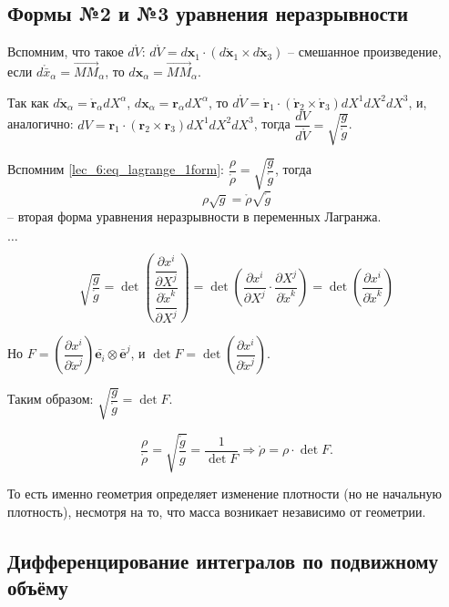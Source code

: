 \subsection{Формы №2 и №3 уравнения неразрывности}

Вспомним, что такое $d\mathring{V}$: $d\mathring{V} = d\mathbf{x}_1 \cdot \left( d\mathring{\mathbf{x}}_1 \times d\mathring{\mathbf{x}}_3 \right) $ -- смешанное произведение, если $d\mathring{\bar{x}}_\alpha = \vec{MM}_\alpha$, то $d\mathbf{x}_\alpha = \vec{MM}_\alpha$.

Так как $d\mathring{\mathbf{x}}_\alpha = \mathring{\mathbf{r}}_\alpha dX^\alpha$,
$d\mathbf{x}_\alpha = \mathbf{r}_\alpha dX^\alpha$, то $d\mathring{V} = \mathring{\mathbf{r}}_1 \cdot \left( \mathring{\mathbf{r}}_2 \times \mathring{\mathbf{r}}_3 \right) dX^1 dX^2 dX^3 $,
и, аналогично: $dV = \mathbf{r}_1 \cdot \left(\mathbf{r}_2 \times \mathbf{r}_3 \right) dX^1 dX^2 dX^3$, тогда $ \dfrac{dV}{d\mathring{V}} = \sqrt{\dfrac{g}{\mathring{g}}} $.

Вспомним \eqref{lec_6:eq_lagrange_1form}: $ \dfrac{\rho}{\mathring{\rho}} = \sqrt{\dfrac{g}{\mathring{g}}} $, тогда
\[
  \rho \sqrt{g} = \mathring{\rho} \sqrt{\mathring{g}}
\]
-- вторая форма уравнения неразрывности в переменных Лагранжа.

$\dots$

\[
  \sqrt{\dfrac{g}{\mathring{g}}}
  = \det\left(\dfrac{\dfrac{\partial x^i}{\partial X^j}}{\dfrac{\partial \mathring{x}^k}{\partial X^j}}\right)
  = \det\left({\dfrac{\partial x^i}{\partial X^j} \cdot \dfrac{\partial X^j}{\partial \mathring{x}^k}}\right)
  = \det \left( \dfrac{\partial x^i}{\partial \mathring{x}^k}  \right) 
\]

Но $F = \left( \dfrac{\partial x^i}{\partial \mathring{x}^j}  \right) \bar{\mathbf{e}_i} \otimes \bar{\mathbf{e}}^j$,
и $\det F = \det \left( \dfrac{\partial x^i}{\partial \mathring{x}^j}  \right) $.

Таким образом: $\sqrt{\dfrac{g}{\mathring{g}}} = \det F$.

\[
  \dfrac{\rho}{\mathring{\rho}} = \sqrt{\dfrac{\mathring{g}}{g}} = \dfrac{1}{\det F}
  \Rightarrow
  \mathring{\rho} = \rho \cdot \det F.
\]

То есть именно геометрия определяет изменение плотности (но не начальную плотность), несмотря
на то, что масса возникает независимо от геометрии.



\subsection{Дифференцирование интегралов по подвижному объёму}

